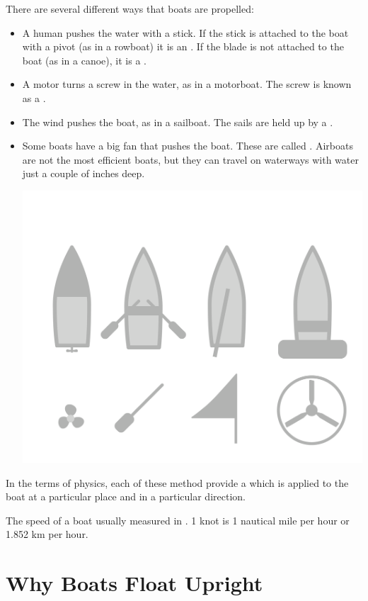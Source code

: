 There are several different ways that boats are propelled:

\begin{itemize}

\item A human pushes the water with a stick.  If the stick is attached to the boat with a pivot (as in a rowboat) it is an .  If the blade is not attached to the boat (as in a canoe), it is a .

\item A motor turns a screw in the water, as in a motorboat. The screw is known as a .

\item The wind pushes the boat,  as in a sailboat.  The sails are held up by a .

\item Some boats have a big fan that pushes the boat.  These are called .   Airboats are not the most efficient boats,  but they can travel
on waterways with water just a couple of inches deep.

\includegraphics[width=.75\textwidth]{boatTypes.png}


\end{itemize}

In the terms of physics,  each of these method provide a  which is applied to the boat at a particular place and in a particular direction.

The speed of a boat usually measured in .  1 knot is 1 nautical mile per hour or 1.852 km per hour.

\section{Why Boats Float Upright}

